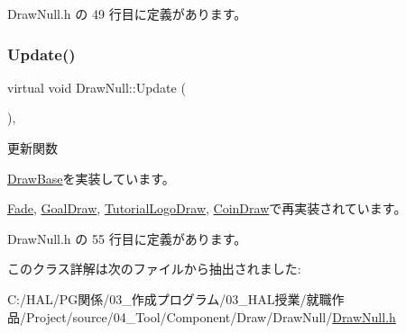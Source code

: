  Draw\+Null.\+h の 49 行目に定義があります。

\mbox{\label{class_draw_null_a0149bcf84a34b138642ab7975ae46f30}} 
\subsubsection{\texorpdfstring{Update()}{Update()}}
{\footnotesize\ttfamily virtual void Draw\+Null\+::\+Update (\begin{DoxyParamCaption}{ }\end{DoxyParamCaption})\hspace{0.3cm}{\ttfamily [inline]}, {\ttfamily [virtual]}}



更新関数 



\mbox{\hyperlink{class_draw_base_af64b19d08a58927a789e2fb8a11cf524}{Draw\+Base}}を実装しています。



\mbox{\hyperlink{class_fade_a1579b5b9020344a1131ea11c15f2c0bd}{Fade}}, \mbox{\hyperlink{class_goal_draw_a6e003277ed44eb9c800a616b6acbcb20}{Goal\+Draw}}, \mbox{\hyperlink{class_tutorial_logo_draw_af69405fcc8b20684a19e982726d93ffa}{Tutorial\+Logo\+Draw}}, \mbox{\hyperlink{class_coin_draw_a6157b17bf1706b85156aad0d88acfd7e}{Coin\+Draw}}で再実装されています。



 Draw\+Null.\+h の 55 行目に定義があります。



このクラス詳解は次のファイルから抽出されました\+:\begin{DoxyCompactItemize}
\item 
C\+:/\+H\+A\+L/\+P\+G関係/03\+\_\+作成プログラム/03\+\_\+\+H\+A\+L授業/就職作品/\+Project/source/04\+\_\+\+Tool/\+Component/\+Draw/\+Draw\+Null/\mbox{\hyperlink{_draw_null_8h}{Draw\+Null.\+h}}\end{DoxyCompactItemize}

